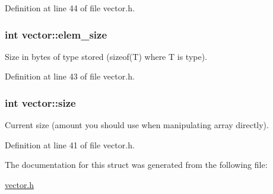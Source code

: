 Definition at line 44 of file vector.h.

\hypertarget{structvector_a1e2d06aaea690d5420fc153fa9b8c2b8}{
\subsubsection[{elem\_\-size}]{\setlength{\rightskip}{0pt plus 5cm}int {\bf vector::elem\_\-size}}}
\label{structvector_a1e2d06aaea690d5420fc153fa9b8c2b8}


Size in bytes of type stored (sizeof(T) where T is type). 



Definition at line 43 of file vector.h.

\hypertarget{structvector_a211c6f9096b87e1ff8b09ad5ad373e61}{
\subsubsection[{size}]{\setlength{\rightskip}{0pt plus 5cm}int {\bf vector::size}}}
\label{structvector_a211c6f9096b87e1ff8b09ad5ad373e61}


Current size (amount you should use when manipulating array directly). 



Definition at line 41 of file vector.h.



The documentation for this struct was generated from the following file:\begin{DoxyCompactItemize}
\item 
\hyperlink{vector_8h}{vector.h}\end{DoxyCompactItemize}
